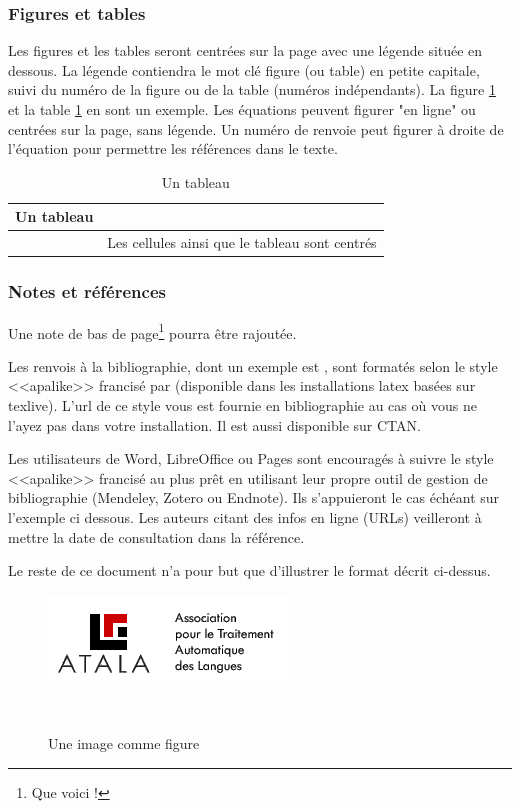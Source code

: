 \documentclass[10pt,a4paper,twoside]{article}
\begin{document}
\subsubsection{Figures et tables}

Les figures et les tables seront centrées sur la page avec une légende située en dessous. La légende contiendra le mot clé figure (ou table) en petite capitale, suivi du numéro de la figure ou de la table (numéros indépendants). La figure \ref{image} et la table \ref{table} en sont un exemple. Les équations peuvent figurer "en ligne" ou centrées sur la page, sans légende. Un numéro de renvoie peut figurer à droite de l'équation pour permettre les références dans le texte.

\begin{table}[!h]
\centering
	\begin{tabular}{|c|p{4cm}|}
	\hline
	Un tableau&\\
	\hline
	&Les cellules ainsi que le tableau sont centrés\\
	\hline
	\end{tabular}
\caption{Un tableau}\label{table}
\end{table}

\subsubsection{Notes et références}

Une note de bas de page\footnote{Que voici !} pourra être rajoutée.

Les renvois à la bibliographie, dont un exemple est \cite{Bernhard07}, sont formatés selon le style <<apalike>> francisé par \cite{apalikefr} (disponible dans les installations latex basées sur texlive). L'url de ce style vous est fournie en bibliographie au cas où vous ne l'ayez pas dans votre installation. Il est aussi disponible sur CTAN.

Les utilisateurs de Word, LibreOffice ou Pages sont encouragés à suivre le style <<apalike>> francisé au plus prêt en utilisant leur propre outil de gestion de bibliographie (Mendeley, Zotero ou Endnote). Ils s'appuieront le cas échéant sur l'exemple ci dessous. Les auteurs citant des infos en ligne (URLs) veilleront à mettre la date de consultation dans la référence.

Le reste de ce document n'a pour but que d'illustrer le format décrit ci-dessus.

\begin{figure}[htbp] 
\begin{center} 
\includegraphics{atala.png}
\end{center} 
\caption{Une image comme figure} \label{image} \
\end{figure}
\end{document}

